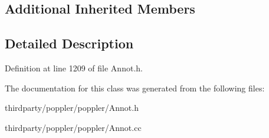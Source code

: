 \subsection*{Additional Inherited Members}


\subsection{Detailed Description}


Definition at line 1209 of file Annot.\+h.



The documentation for this class was generated from the following files\+:\begin{DoxyCompactItemize}
\item 
thirdparty/poppler/poppler/Annot.\+h\item 
thirdparty/poppler/poppler/Annot.\+cc\end{DoxyCompactItemize}
